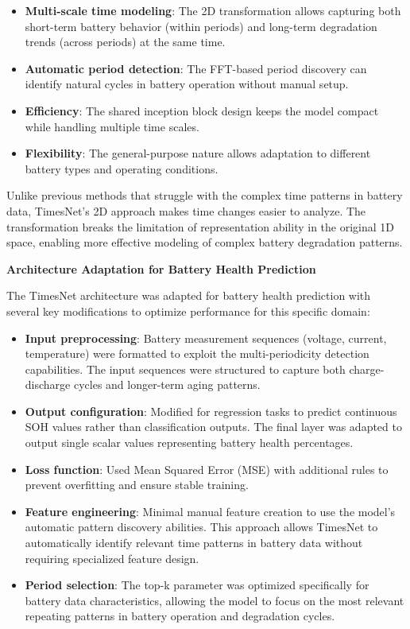 \begin{itemize}
\item \textbf{Multi-scale time modeling}: The 2D transformation allows capturing both short-term battery behavior (within periods) and long-term degradation trends (across periods) at the same time.
\item \textbf{Automatic period detection}: The FFT-based period discovery can identify natural cycles in battery operation without manual setup.
\item \textbf{Efficiency}: The shared inception block design keeps the model compact while handling multiple time scales.
\item \textbf{Flexibility}: The general-purpose nature allows adaptation to different battery types and operating conditions.
\end{itemize}

Unlike previous methods that struggle with the complex time patterns in battery data, TimesNet's 2D approach makes time changes easier to analyze. The transformation breaks the limitation of representation ability in the original 1D space, enabling more effective modeling of complex battery degradation patterns.

\textbf{Architecture Adaptation for Battery Health Prediction}
\label{subsec:timesnet_adaptation}

The TimesNet architecture was adapted for battery health prediction with several key modifications to optimize performance for this specific domain:

\begin{itemize}
    \item \textbf{Input preprocessing}: Battery measurement sequences (voltage, current, temperature) were formatted to exploit the multi-periodicity detection capabilities. The input sequences were structured to capture both charge-discharge cycles and longer-term aging patterns.
    \item \textbf{Output configuration}: Modified for regression tasks to predict continuous SOH values rather than classification outputs. The final layer was adapted to output single scalar values representing battery health percentages.
    \item \textbf{Loss function}: Used Mean Squared Error (MSE) with additional rules to prevent overfitting and ensure stable training.
    \item \textbf{Feature engineering}: Minimal manual feature creation to use the model's automatic pattern discovery abilities. This approach allows TimesNet to automatically identify relevant time patterns in battery data without requiring specialized feature design.
    \item \textbf{Period selection}: The top-k parameter was optimized specifically for battery data characteristics, allowing the model to focus on the most relevant repeating patterns in battery operation and degradation cycles.
\end{itemize}


